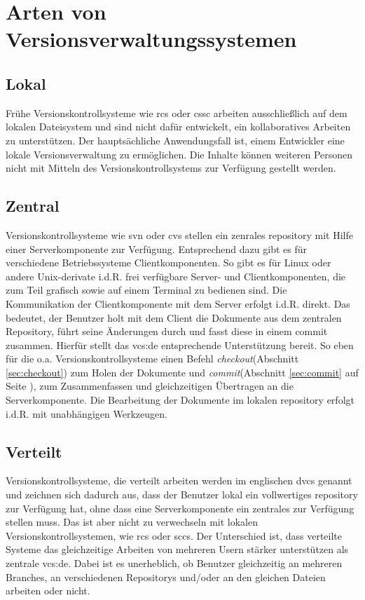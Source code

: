 \section{Arten von Versionsverwaltungssystemen}
\subsection{Lokal}\label{sec:local}
Frühe Versionskontrollsysteme wie \acrshort{rcs} oder \acrshort{cssc} arbeiten
ausschließlich auf dem lokalen Dateisystem und sind nicht dafür entwickelt, ein
kollaboratives Arbeiten zu unterstützen. Der hauptsächliche Anwendungsfall ist,
einem Entwickler eine lokale Versionsverwaltung zu ermöglichen. Die Inhalte
können weiteren Personen nicht mit Mitteln des Versionskontrollsystems zur
Verfügung gestellt werden.

\subsection{Zentral}\label{sec:central}
Versionskontrollsysteme wie \acrshort{svn} oder \acrshort{cvs} stellen ein
zenrales \gls{repository} mit Hilfe einer Serverkomponente zur Verfügung.
Entsprechend dazu gibt es für verschiedene Betriebssysteme Clientkomponenten.
So gibt es für Linux oder andere Unix-derivate i.d.R. frei verfügbare Server-
und Clientkomponenten, die zum Teil grafisch sowie auf einem Terminal zu
bedienen sind. Die Kommunikation der Clientkomponente mit dem Server erfolgt
i.d.R. direkt. Das bedeutet, der Benutzer holt mit dem Client die Dokumente aus
dem zentralen Repository, führt seine Änderungen durch und fasst diese in einem
\gls{commit} zusammen. Hierfür stellt das \acrlong{vcs:de} entsprechende
Unterstützung bereit. So eben für die o.a. Versionskontrollsysteme einen Befehl
\textit{checkout}(Abschnitt \ref{sec:checkout})
zum Holen der Dokumente und \textit{commit}(Abschnitt \ref{sec:commit} auf
Seite \pageref{sec:commit}), zum Zusammenfassen und gleichzeitigen Übertragen
an die Serverkomponente. Die Bearbeitung der Dokumente im lokalen
\gls{repository} erfolgt i.d.R. mit unabhängigen
Werkzeugen.\cite[S.~38-40]{hagen:1678}

\subsection{Verteilt}\label{sec:decentral}
Versionskontrollsysteme, die verteilt arbeiten werden im englischen
\acrfull{dvcs} genannt und zeichnen sich dadurch aus, dass der Benutzer lokal
ein vollwertiges \gls{repository} zur Verfügung hat, ohne dass eine
Serverkomponente ein zentrales zur Verfügung stellen muss. Das ist aber nicht
zu verwechseln mit lokalen Versionskontrollsystemen, wie \acrshort{rcs} oder
\acrshort{sccs}. Der Unterschied ist, dass verteilte Systeme das gleichzeitige
Arbeiten von mehreren Usern stärker unterstützen als zentrale
\acrshort{vcs:de}. Dabei ist es unerheblich, ob Benutzer gleichzeitig an
mehreren Branches, an verschiedenen Repositorys und/oder an den gleichen
Dateien arbeiten oder nicht.\cite[S.~393-394]{cd}

